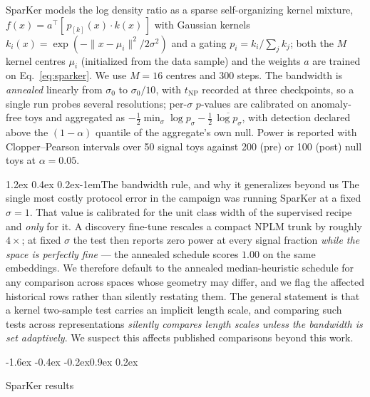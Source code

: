 \documentclass{article}
\makeatletter
\renewcommand\subsection{\@startsection{subsection}{2}{\z@}%
  {-1.6ex \@plus -0.4ex \@minus -0.2ex}{0.9ex \@plus 0.2ex}%
  {\normalsize\bf\raggedright}}
\renewcommand\paragraph{\@startsection{paragraph}{4}{\z@}%
  {1.2ex \@plus 0.4ex \@minus 0.2ex}{-1em}{\normalsize\bf}}
\makeatother
\begin{document}
SparKer models the log density ratio as a sparse self-organizing kernel
mixture, $f(x) = a^{\!\top}[\,p_{[k]}(x)\cdot k(x)\,]$ with Gaussian kernels
$k_i(x)=\exp(-\|x-\mu_i\|^2/2\sigma^2)$ and a gating
$p_i = k_i/\sum_j k_j$; both the $M$ kernel centres $\mu_i$ (initialized from
the data sample) and the weights $a$ are trained on Eq.~\eqref{eq:sparker}. We
use $M=16$ centres and 300 steps. The bandwidth is \emph{annealed} linearly
from $\sigma_0$ to $\sigma_0/10$, with $t_{\mathrm{NP}}$ recorded at three
checkpoints, so a single run probes several resolutions; per-$\sigma$ $p$-values
are calibrated on anomaly-free toys and aggregated as
$-\tfrac12\min_\sigma\log p_\sigma - \tfrac12\,\overline{\log p_\sigma}$, with
detection declared above the $(1-\alpha)$ quantile of the aggregate's own null.
Power is reported with Clopper--Pearson intervals over 50 signal toys against
200 (pre) or 100 (post) null toys at $\alpha=0.05$.

\paragraph{The bandwidth rule, and why it generalizes beyond us}
The single most costly protocol error in the campaign was running SparKer at a
fixed $\sigma=1$. That value is calibrated for the unit class width of the
supervised recipe and \emph{only} for it. A discovery fine-tune rescales a
compact NPLM trunk by roughly $4\times$; at fixed $\sigma$ the test then
reports zero power at every signal fraction \emph{while the space is
perfectly fine} --- the annealed schedule scores $1.00$ on the same
embeddings. We therefore default to the annealed median-heuristic schedule for
any comparison across spaces whose geometry may differ, and we flag the
affected historical rows rather than silently restating them. The general
statement is that a kernel two-sample test carries an implicit length scale,
and comparing such tests across representations \emph{silently compares length
scales unless the bandwidth is set adaptively}. We suspect this affects
published comparisons beyond this work.

\subsection{SparKer results}
\label{sec:sparker-results}
\end{document}
